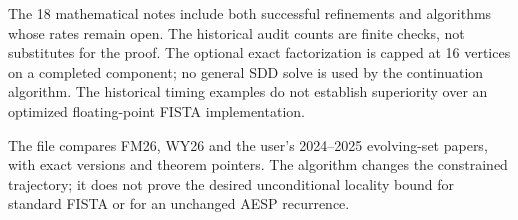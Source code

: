 \documentclass[11pt]{article}
\begin{document}
The 18 mathematical notes include both successful refinements and algorithms
whose rates remain open. The historical audit counts are finite checks,
not substitutes for the proof. The optional exact factorization is capped at
16 vertices on a completed component; no general SDD solve is used by the
continuation algorithm. The historical timing examples do not establish
superiority over an optimized floating-point FISTA implementation.

The file  compares FM26, WY26 and the user's
2024--2025 evolving-set papers, with exact versions and theorem pointers.
The algorithm changes the constrained trajectory; it does not prove the
desired unconditional locality bound for standard FISTA or for an unchanged
AESP recurrence.
\end{document}
